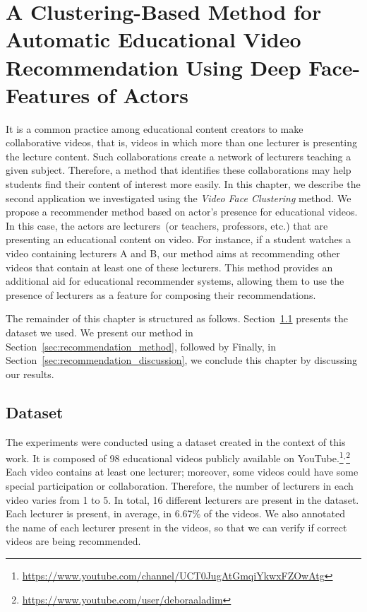 \newpage
\chapter{A Clustering-Based Method for Automatic Educational Video Recommendation Using Deep Face-Features of Actors}
\label{chap:educational_recommendation}

It is a common practice among educational content creators to make collaborative videos, that is, videos in which more than one lecturer is presenting the lecture content.
Such collaborations create a network of lecturers teaching a given subject.
Therefore, a method that identifies these collaborations may help students find their content of interest more easily.
In this chapter, we describe the second application we investigated using the \emph{Video Face Clustering} method.
We propose a recommender method based on actor's presence for educational videos. In this case, the actors are lecturers~(or teachers, professors, etc.) that are presenting an educational content on video.
For instance, if a student watches a video containing lecturers A and B, our method aims at recommending other videos that contain at least one of these lecturers. 
This method provides an additional aid for educational recommender systems, allowing them to use the presence of lecturers as a feature for composing their recommendations.

The remainder of this chapter is structured as follows.
Section~\ref{sec:recommendation_dataset} presents the dataset we used.
We present our method in Section~\ref{sec:recommendation_method}, followed by 
Finally, in Section~\ref{sec:recommendation_discussion}, we conclude this chapter by discussing our results.

\section{Dataset}
\label{sec:recommendation_dataset}

The experiments were conducted using a dataset created in the context of this work.
It is composed of 98 educational videos publicly available on YouTube.\footnote{\url{https://www.youtube.com/channel/UCT0JugAtGmqiYkwxFZOwAtg}}$^{,}$\footnote{\url{https://www.youtube.com/user/deboraaladim}}
Each video contains at least one lecturer; moreover, some videos could have some special participation or collaboration. Therefore, the number of lecturers in each video varies from 1 to 5. In total, 16 different lecturers are present in the dataset. Each lecturer is present, in average, in 6.67\% of the videos.
We also annotated the name of each lecturer present in the videos, so that we can verify if correct videos are being recommended.

